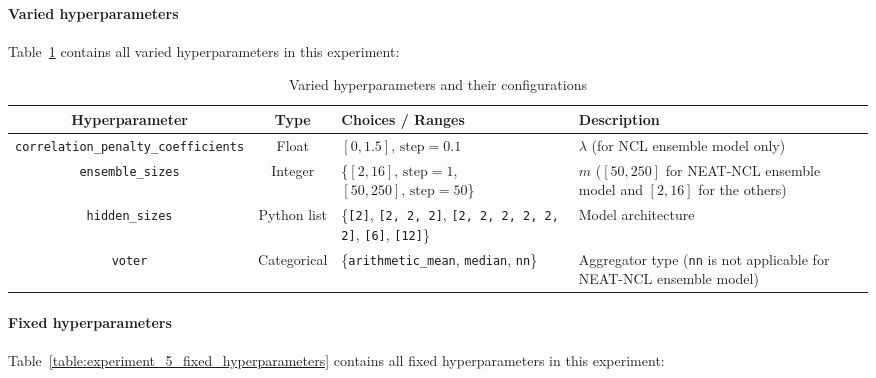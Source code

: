 \documentclass{article}
\begin{document}
\paragraph{Varied hyperparameters}
Table~\ref{table:experiment_5_varied_hyperparameters} contains all varied hyperparameters in this experiment: 

\begin{table}[H]
    \centering
    \begin{tabular}{|c|c|p{3cm}|p{5cm}|}
        \hline
        Hyperparameter & Type & Choices / Ranges & Description \\
        \hline
        \small\texttt{correlation\_penalty\_coefficients} & Float & $[0, 1.5]\text{, step}=0.1$ & $\lambda$ (for NCL ensemble model only) \\
        \hline
        \small\texttt{ensemble\_sizes} & Integer & \{$[2, 16]\text{, step}=1$, $[50, 250]\text{, step}=50$\} & $m$ ($[50, 250]$ for NEAT-NCL ensemble model and $[2, 16]$ for the others) \\
        \hline
        \small\texttt{hidden\_sizes} & Python list & \{\texttt{[2]}, \texttt{[2, 2, 2]}, \texttt{[2, 2, 2, 2, 2, 2]}, \texttt{[6]}, \texttt{[12]}\} & Model architecture \\
        \hline
        \small\texttt{voter} & Categorical & \{\texttt{arithmetic\_mean}, \texttt{median}, \texttt{nn}\} & Aggregator type (\texttt{nn} is not applicable for NEAT-NCL ensemble model) \\
        \hline
    \end{tabular}
    \caption{Varied hyperparameters and their configurations}
    \label{table:experiment_5_varied_hyperparameters}
\end{table}

\paragraph{Fixed hyperparameters}
Table~\ref{table:experiment_5_fixed_hyperparameters} contains all fixed hyperparameters in this experiment: 
\end{document}
